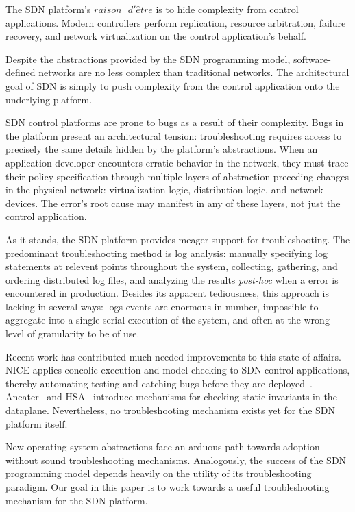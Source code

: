 The SDN platform's $raison\text{ }d'\hat{e}tre$ is to 
hide complexity from control applications. Modern controllers perform
replication, resource arbitration, failure recovery, and network 
virtualization on the control application's behalf. 

Despite the abstractions provided by the SDN programming model,
software-defined networks are no less complex than traditional networks. The architectural goal of SDN is
simply to push complexity from the control application onto the underlying platform.

SDN control platforms are prone to bugs as a result of their complexity. Bugs in the
platform present an architectural tension: troubleshooting requires
access to precisely the same details hidden by the platform's abstractions.
When an application developer 
encounters erratic behavior in the network, they must trace their
policy specification through multiple layers of abstraction
preceding changes in the physical network: virtualization logic,
distribution logic, and network devices. The error's root cause
may manifest in any of these layers, not just the control application.

As it stands, the SDN platform provides meager support for troubleshooting.
The predominant troubleshooting method is log analysis: manually
specifying log statements at relevent points throughout the system,
collecting, gathering, and ordering distributed log files, and analyzing the
results {\it post-hoc} when a error is encountered in production. Besides its
apparent tediousness, this approach is lacking in several ways: logs events
are enormous in number, impossible to aggregate into a single serial
execution of the system, and often at the wrong level of granularity to be of
use. 

Recent work has contributed much-needed improvements to this state of affairs. 
NICE applies concolic execution and model checking to SDN control
applications, thereby automating testing and catching bugs before
they are deployed~\cite{nice}. Aneater~\cite{anteater} and HSA~\cite{hsa}
introduce mechanisms for checking static invariants in the dataplane.
Nevertheless, no troubleshooting mechanism exists yet for the SDN platform itself.

New operating system abstractions face an arduous path towards adoption
without sound troubleshooting mechanisms. Analogously, the success of the
SDN programming model depends heavily on the utility of its troubleshooting
paradigm. Our goal in this paper is to work towards a useful
troubleshooting mechanism for the SDN platform. 

